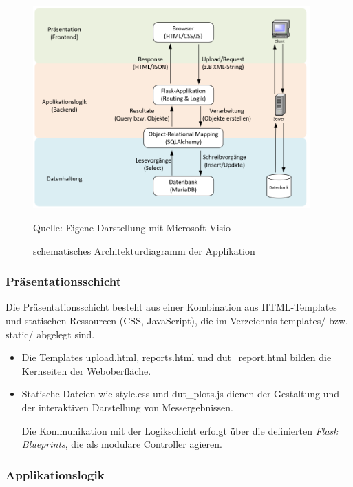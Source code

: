 \begin{figure}[H]
    \centering
    \includegraphics[width=0.95\textwidth]{Grafiken/Architekturdiagramm}
    \caption{schematisches Architekturdiagramm der Applikation}
    \label{fig:arch_minimal}
    {Quelle: Eigene Darstellung mit Microsoft Visio}
\end{figure}

\subsubsection*{Präsentationsschicht}


Die Präsentationsschicht besteht aus einer Kombination aus HTML-Templates und statischen Ressourcen (CSS, JavaScript), die im Verzeichnis templates/ bzw. static/ abgelegt sind.


\begin{itemize}

\item
Die Templates upload.html, reports.html und dut\_report.html bilden die Kernseiten der Weboberfläche.

\item
Statische Dateien wie style.css und dut\_plots.js dienen der Gestaltung und der interaktiven Darstellung von Messergebnissen.

Die Kommunikation mit der Logikschicht erfolgt über die definierten \textit{Flask Blueprints}, die als modulare Controller agieren.

\end{itemize}

\subsubsection*{Applikationslogik}

